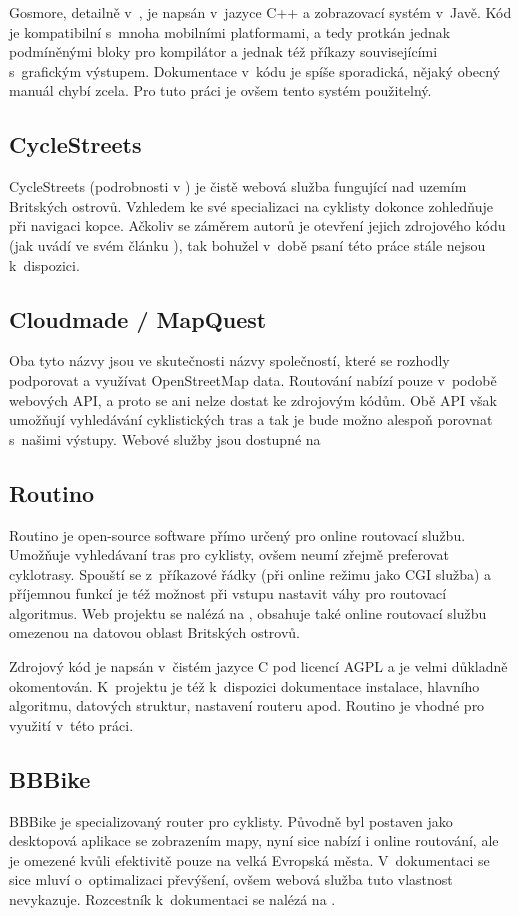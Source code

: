 \documentclass[thesis=B,czech]{FITthesis}[2012/06/26]
\begin{document}
Gosmore, detailně v~\cite{gosmore}, je napsán v~jazyce C++ a zobrazovací systém v~Javě. Kód je kompatibilní s~mnoha mobilními platformami, a tedy protkán jednak podmíněnými bloky pro kompilátor a jednak též příkazy souvisejícími s~grafickým výstupem. Dokumentace v~kódu je spíše sporadická, nějaký obecný manuál chybí zcela. Pro tuto práci je ovšem tento systém použitelný.

\subsection{CycleStreets}
CycleStreets (podrobnosti v \cite{cyclestreets}) je čistě webová služba fungující nad uzemím Britských ostrovů. Vzhledem ke své specializaci na cyklisty dokonce zohledňuje při navigaci kopce. Ačkoliv se záměrem autorů je otevření jejich zdrojového kódu (jak uvádí ve svém článku \cite{cyclestreets-article}), tak bohužel v~době psaní této práce stále nejsou k~dispozici. 

\subsection{Cloudmade / MapQuest}
Oba tyto názvy jsou ve skutečnosti názvy společností, které se rozhodly podporovat a využívat OpenStreetMap data. Routování nabízí pouze v~podobě webových API, a proto se ani nelze dostat ke zdrojovým kódům. Obě API však umožňují vyhledávání cyklistických tras a tak je bude možno alespoň porovnat s~našimi výstupy. Webové služby jsou dostupné na \cite{cloudmade,mapquest}


\subsection{Routino}
Routino je open-source software přímo určený pro online routovací službu. Umožňuje vyhledávaní tras pro cyklisty, ovšem neumí zřejmě preferovat cyklotrasy. Spouští se z~příkazové řádky (při online režimu jako CGI služba) a příjemnou funkcí je též možnost při vstupu nastavit váhy pro routovací algoritmus. Web projektu se nalézá na \cite{routino}, obsahuje také online routovací službu omezenou na datovou oblast Britských ostrovů.

Zdrojový kód je napsán v~čistém jazyce C pod licencí AGPL a je velmi důkladně okomentován. K~projektu je též k~dispozici dokumentace instalace, hlavního algoritmu, datových struktur, nastavení routeru apod. Routino je vhodné pro využití v~této práci.

\subsection{BBBike}
BBBike je specializovaný router pro cyklisty. Původně byl postaven jako desktopová aplikace se zobrazením mapy, nyní sice nabízí i online routování, ale je omezené kvůli efektivitě pouze na velká Evropská města. V~dokumentaci se sice mluví o~optimalizaci převýšení, ovšem webová služba tuto vlastnost nevykazuje. Rozcestník k~dokumentaci se nalézá na \cite{bbbike}.
\end{document}
